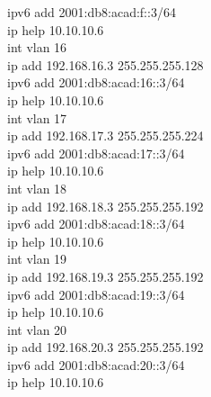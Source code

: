 \documentclass[a4paper, 12pt]{article}
\begin{document}
{\hspace*{2cm}ipv6 add 2001:db8:acad:f::3/64\\
\hspace*{2cm}ip help 10.10.10.6\\
\hspace*{2cm}int vlan 16\\
\hspace*{2cm}ip add 192.168.16.3 255.255.255.128\\
\hspace*{2cm}ipv6 add 2001:db8:acad:16::3/64\\
\hspace*{2cm}ip help 10.10.10.6\\
\hspace*{2cm}int vlan 17\\
\hspace*{2cm}ip add 192.168.17.3 255.255.255.224\\
\hspace*{2cm}ipv6 add 2001:db8:acad:17::3/64\\
\hspace*{2cm}ip help 10.10.10.6\\
\hspace*{2cm}int vlan 18\\
\hspace*{2cm}ip add 192.168.18.3 255.255.255.192\\
\hspace*{2cm}ipv6 add 2001:db8:acad:18::3/64\\
\hspace*{2cm}ip help 10.10.10.6\\
\hspace*{2cm}int vlan 19\\
\hspace*{2cm}ip add 192.168.19.3 255.255.255.192\\
\hspace*{2cm}ipv6 add 2001:db8:acad:19::3/64\\
\hspace*{2cm}ip help 10.10.10.6\\
\hspace*{2cm}int vlan 20\\
\hspace*{2cm}ip add 192.168.20.3 255.255.255.192\\
\hspace*{2cm}ipv6 add 2001:db8:acad:20::3/64\\
\hspace*{2cm}ip help 10.10.10.6\\
}
\end{document}
